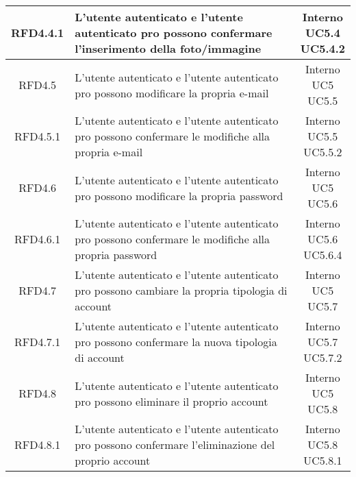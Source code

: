 \begin{longtable}{|c|>{\centering}m{7cm}|c|}
			 \hypertarget{{RFD4.4.1}}{{RFD4.4.1}} & L’utente autenticato e l’utente autenticato pro possono confermare l’inserimento della foto/immagine & \makecell{Interno\\ UC5.4 \\UC5.4.2 } \\ \hline
			 \hypertarget{{RFD4.5}}{{RFD4.5}} & L’utente autenticato e l’utente autenticato pro possono modificare la propria e-mail  & \makecell{Interno\\ UC5 \\UC5.5 } \\ \hline
			 \hypertarget{{RFD4.5.1}}{{RFD4.5.1}} & L’utente autenticato e l’utente autenticato pro possono confermare le modifiche alla propria e-mail  & \makecell{Interno\\ UC5.5 \\UC5.5.2 } \\ \hline
			 \hypertarget{{RFD4.6}}{{RFD4.6}} & L’utente autenticato e l’utente autenticato pro possono modificare la propria password & \makecell{Interno\\ UC5 \\UC5.6 } \\ \hline
			 \hypertarget{{RFD4.6.1}}{{RFD4.6.1}} & L’utente autenticato e l’utente autenticato pro possono confermare le modifiche alla propria password  & \makecell{Interno\\ UC5.6 \\UC5.6.4 } \\ \hline
			 \hypertarget{{RFD4.7}}{{RFD4.7}} & L’utente autenticato e l’utente autenticato pro possono cambiare la propria tipologia di account & \makecell{Interno\\ UC5 \\UC5.7 } \\ \hline
			 \hypertarget{{RFD4.7.1}}{{RFD4.7.1}} & L’utente autenticato e l’utente autenticato pro possono confermare la nuova tipologia di account  & \makecell{Interno\\ UC5.7 \\UC5.7.2 } \\ \hline
			 \hypertarget{{RFD4.8}}{{RFD4.8}} & L’utente autenticato e l’utente autenticato pro possono eliminare il proprio account  & \makecell{Interno\\ UC5 \\UC5.8 } \\ \hline
			 \hypertarget{{RFD4.8.1}}{{RFD4.8.1}} & L’utente autenticato e l’utente autenticato pro possono confermare l’eliminazione del proprio account & \makecell{Interno\\ UC5.8 \\UC5.8.1 } \\ \hline

\end{longtable}
